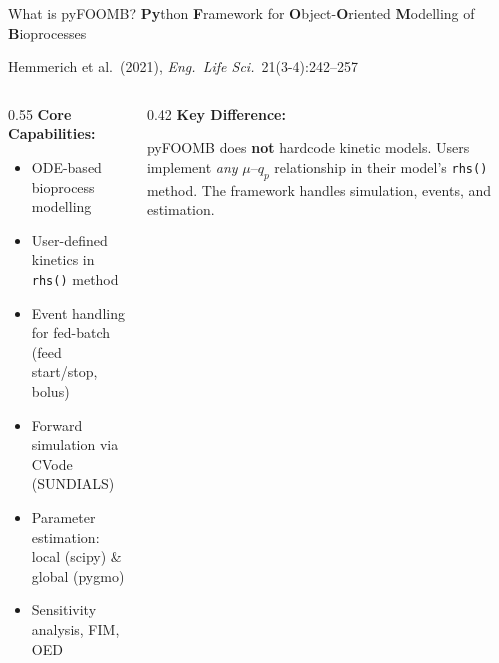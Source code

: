 \documentclass[aspectratio=169, 11pt]{beamer}
\begin{document}
\begin{frame}{What is pyFOOMB?}
  \textbf{Py}thon \textbf{F}ramework for \textbf{O}bject-\textbf{O}riented \textbf{M}odelling of \textbf{B}ioprocesses

  \vspace{0.2cm}
  {\small Hemmerich et al.\ (2021), \textit{Eng.\ Life Sci.}\ 21(3-4):242--257}

  \vspace{0.3cm}
  \begin{columns}[T]
    \begin{column}{0.55\textwidth}
      \textbf{Core Capabilities:}
      \begin{itemize}
        \item ODE-based bioprocess modelling
        \item User-defined kinetics in \texttt{rhs()} method
        \item Event handling for fed-batch (feed start/stop, bolus)
        \item Forward simulation via CVode (SUNDIALS)
        \item Parameter estimation: local (scipy) \& global (pygmo)
        \item Sensitivity analysis, FIM, OED
      \end{itemize}
    \end{column}
    \begin{column}{0.42\textwidth}
      \textbf{Key Difference:}
      \begin{block}{}
        pyFOOMB does \textbf{not} hardcode kinetic models.
        Users implement \textit{any} $\mu$--$q_p$ relationship
        in their model's \texttt{rhs()} method. The framework handles
        simulation, events, and estimation.
      \end{block}
    \end{column}
  \end{columns}
\end{frame}
\end{document}

